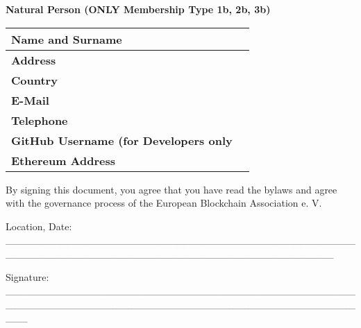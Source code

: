 \documentclass{article}
\begin{document}
\newpage

\textbf{Natural Person (ONLY Membership Type 1b, 2b, 3b)}
\begin{longtable}{| p{} | p{} |}
	\hline
	\newline 
	\textbf{Name and Surname} \newline & \\
	\hline	
	\newline 
	\textbf{Address} \newline & \\
	\hline	
	\newline 
	\textbf{Country} \newline & \\
	\hline
	\newline 
	\textbf{E-Mail} \newline & \\
	\hline	
	\newline 
	\textbf{Telephone} \newline & \\
	\hline
	\newline 
	\textbf{GitHub Username (for Developers only} \newline & \\
	\hline	
	\newline 
	\textbf{Ethereum Address} \newline & \\
	\hline	
\end{longtable}
\vspace{3cm}


By signing this document, you agree that you have read the bylaws and agree with the governance process of the European Blockchain Association e. V.

\vspace{2cm}

Location, Date: \_\_\_\_\_\_\_\_\_\_\_\_\_\_\_\_\_\_\_\_\_\_\_\_\_\_\_\_\_\_\_\_\_\_\_\_\_\_\_\_\_\_\_\_\_\_\_\_\_\_\_\_\_\_\_\_\_\_\_\_\_\_\_\_\_\_\_\_\_\_\_\_\_\_\_\_\_\_\_\_\_\_\_\_\_\_\_\_\_\_\_\_\_

\vspace{2cm}

Signature: \_\_\_\_\_\_\_\_\_\_\_\_\_\_\_\_\_\_\_\_\_\_\_\_\_\_\_\_\_\_\_\_\_\_\_\_\_\_\_\_\_\_\_\_\_\_\_\_\_\_\_\_\_\_\_\_\_\_\_\_\_\_\_\_\_\_\_\_\_\_\_\_\_\_\_\_\_\_\_\_\_\_\_\_\_\_\_\_\_\_\_\_\_\_\_\_\_\_\_	
\end{document}
